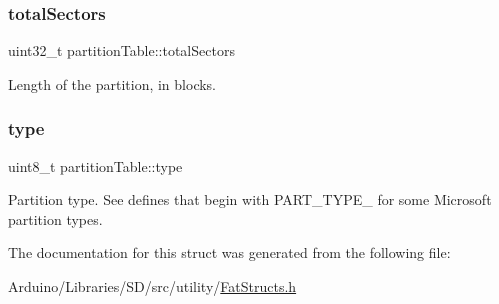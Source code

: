 \subsubsection{\texorpdfstring{total\+Sectors}{totalSectors}}
{\footnotesize\ttfamily uint32\+\_\+t partition\+Table\+::total\+Sectors}

Length of the partition, in blocks. \mbox{\label{structpartition_table_a3861cf276c728c4dd30ca04e74197ee8}} 
\subsubsection{\texorpdfstring{type}{type}}
{\footnotesize\ttfamily uint8\+\_\+t partition\+Table\+::type}

Partition type. See defines that begin with P\+A\+R\+T\+\_\+\+T\+Y\+P\+E\+\_\+ for some Microsoft partition types. 

The documentation for this struct was generated from the following file\+:\begin{DoxyCompactItemize}
\item 
Arduino/\+Libraries/\+S\+D/src/utility/\hyperlink{_fat_structs_8h}{Fat\+Structs.\+h}\end{DoxyCompactItemize}
